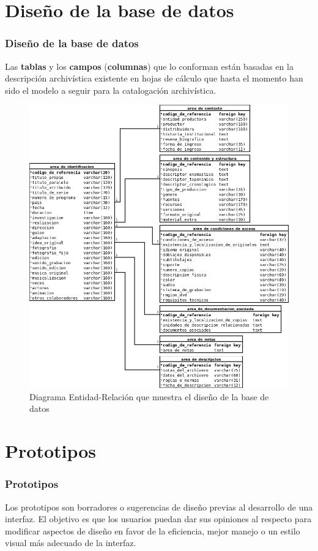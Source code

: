 \documentclass{beamer}
\begin{document}
\section{Diseño de la base de datos}
\begin{frame}
	\frametitle{Diseño de la base de datos}
	Las \textbf{tablas} y los \textbf{campos} (\textbf{columnas}) que lo conforman están basadas en la descripción archivística existente en hojas de cálculo que hasta el momento han sido el modelo a seguir para la catalogación archivística.
\end{frame}

\begin{frame}
	\begin{figure}[H]
		\centering
		\includegraphics[keepaspectratio=true,scale=0.2]{EntidadRelacion.png}
		\caption{Diagrama Entidad-Relación que muestra el diseño de la base de datos}
		\label{fig:entidad_relacion}
	\end{figure}
\end{frame}

\section{Prototipos}
\begin{frame}
	\frametitle{Prototipos}
	Los prototipos son borradores o sugerencias de diseño previas al desarrollo de una interfaz. El objetivo es que los usuarios puedan dar sus opiniones al respecto para modificar aspectos de diseño en favor de la eficiencia, mejor manejo o un estilo visual más adecuado de la interfaz.
\end{frame}
\end{document}
